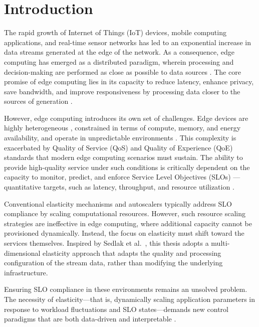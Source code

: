 \chapter{Introduction}

The rapid growth of Internet of Things (IoT) devices, mobile computing applications, and real-time sensor networks has led to an exponential increase in data streams generated at the edge of the network. As a consequence, edge computing has emerged as a distributed paradigm, wherein processing and decision-making are performed as close as possible to data sources \cite{deng_edge_2020}. The core promise of edge computing lies in its capacity to
reduce latency, enhance privacy, save bandwidth, and improve responsiveness by processing data closer to the sources of generation \cite{deng_edge_2020}. 

However, edge computing introduces its own set of challenges. Edge devices are highly heterogeneous \cite{furst_elastic_2018}, constrained in terms of compute, memory, and energy availability, and operate in unpredictable environments \cite{sedlak_active_2024, danilenka_adaptive_2025}. This complexity is exacerbated by Quality of Service (QoS) and Quality of Experience (QoE) standards that modern edge computing scenarios must sustain. The ability to provide high-quality service under such conditions is critically dependent on the capacity to monitor, predict, and enforce Service Level Objectives (SLOs) ---quantitative targets, such as latency, throughput, and resource utilization \cite{sedlak_diffusing_2024, nastic_sloc_2020}. 

Conventional elasticity mechanisms and autoscalers typically address SLO compliance by scaling computational resources. However, such resource scaling strategies are ineffective in edge computing, where additional capacity cannot be provisioned dynamically. Instead, the focus on elasticity must shift toward the services themselves. Inspired by Sedlak et al.~\cite{sedlak_towards_2025}, this thesis adopts a multi-dimensional elasticity approach that adapts the quality and processing configuration of the stream data, rather than modifying the underlying infrastructure.

Ensuring SLO compliance in these environments remains an unsolved problem. The necessity of elasticity—that is, dynamically scaling application parameters in response to workload fluctuations and SLO states—demands new control paradigms that are both data-driven and interpretable \cite{lapkovskis_benchmarking_2025, dias_de_assuncao_distributed_2018}.

